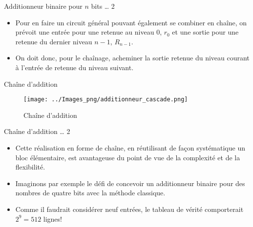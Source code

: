 \documentclass[presentation]{beamer}
\begin{document}
\begin{frame}[label={sec:org5f03573}]{Additionneur binaire pour \(n\) bits \ldots{} 2}
\begin{itemize}
\item Pour en faire un circuit général pouvant également se combiner en
chaîne, on prévoit une entrée pour une retenue au niveau 0, \(r_0\)
et une sortie pour une retenue du dernier niveau \(n-1\),
\(R_{n-1}\).

\item On doit donc, pour le chaînage, acheminer la sortie retenue du
niveau courant à l'entrée de retenue du niveau suivant.
\end{itemize}
\end{frame}


\begin{frame}[label={sec:org1621b05}]{Chaîne d'addition}
\begin{figure}[htbp]
\centering
\texttt{[image: ../Images\_png/additionneur\_cascade.png]}
\caption{\label{fig:org34cbec8}Chaîne d'addition}
\end{figure}
\end{frame}

\begin{frame}[label={sec:orgd50fb6b}]{Chaîne d'addition \ldots{} 2}
\begin{itemize}
\item Cette réalisation en forme de chaîne, en réutilisant de façon
systématique un bloc élémentaire, est avantageuse du point de vue de
la complexité et de la flexibilité.

\item Imaginons par exemple le défi de concevoir un additionneur binaire pour des nombres de quatre bits avec la méthode classique.

\item Comme il faudrait considérer neuf entrées, le tableau de vérité comporterait \(2^9= 512\) lignes!
\end{itemize}
\end{frame}
\end{document}
